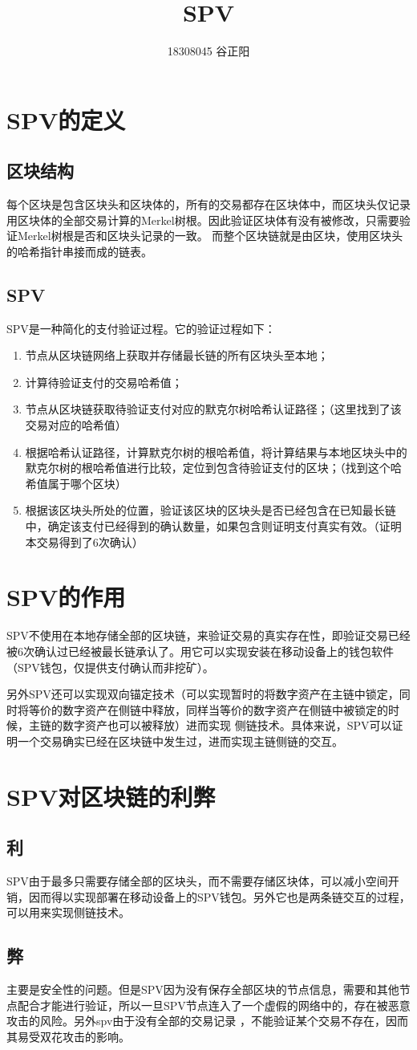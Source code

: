 \documentclass[UTF8,12pt]{article}
\title{SPV}
\date{}
\author{18308045 谷正阳}
\begin{document}
\maketitle
\section{SPV的定义}
\subsection{区块结构}
每个区块是包含区块头和区块体的，所有的交易都存在区块体中，而区块头仅记录用区块体的全部交易计算的Merkel树根。因此验证区块体有没有被修改，只需要验证Merkel树根是否和区块头记录的一致。
而整个区块链就是由区块，使用区块头的哈希指针串接而成的链表。
\subsection{SPV}
SPV是一种简化的支付验证过程。它的验证过程如下：
\begin{enumerate}
    \item 节点从区块链网络上获取并存储最长链的所有区块头至本地；
    \item 计算待验证支付的交易哈希值；
    \item 节点从区块链获取待验证支付对应的默克尔树哈希认证路径；（这里找到了该交易对应的哈希值）
    \item 根据哈希认证路径，计算默克尔树的根哈希值，将计算结果与本地区块头中的默克尔树的根哈希值进行比较，定位到包含待验证支付的区块；（找到这个哈希值属于哪个区块）
    \item 根据该区块头所处的位置，验证该区块的区块头是否已经包含在已知最长链中，确定该支付已经得到的确认数量，如果包含则证明支付真实有效。（证明本交易得到了6次确认）
\end{enumerate}
\section{SPV的作用}
SPV不使用在本地存储全部的区块链，来验证交易的真实存在性，即验证交易已经被6次确认过已经被最长链承认了。用它可以实现安装在移动设备上的钱包软件（SPV钱包，仅提供支付确认而非挖矿）。

另外SPV还可以实现双向锚定技术（可以实现暂时的将数字资产在主链中锁定，同时将等价的数字资产在侧链中释放，同样当等价的数字资产在侧链中被锁定的时候，主链的数字资产也可以被释放）进而实现
侧链技术。具体来说，SPV可以证明一个交易确实已经在区块链中发生过，进而实现主链侧链的交互。
\section{SPV对区块链的利弊}
\subsection{利}
SPV由于最多只需要存储全部的区块头，而不需要存储区块体，可以减小空间开销，因而得以实现部署在移动设备上的SPV钱包。另外它也是两条链交互的过程，可以用来实现侧链技术。
\subsection{弊}
主要是安全性的问题。但是SPV因为没有保存全部区块的节点信息，需要和其他节点配合才能进行验证，所以一旦SPV节点连入了一个虚假的网络中的，存在被恶意攻击的风险。另外spv由于没有全部的交易记录
，不能验证某个交易不存在，因而其易受双花攻击的影响。
\end{document}
